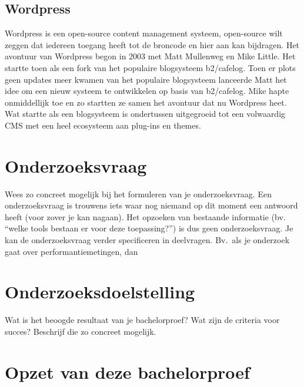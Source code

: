 \subsection{Wordpress}
Wordpress is een open-source content management systeem, open-source wilt zeggen dat iedereen toegang heeft tot de broncode en hier aan kan bijdragen. Het avontuur van Wordpress begon in 2003 met Matt Mullenweg en Mike Little. Het startte toen als een fork van het populaire blogsysteem b2/cafelog. Toen er plots geen updates meer kwamen van het populaire blogsysteem lanceerde Matt het idee om een nieuw systeem te ontwikkelen op basis van b2/cafelog. Mike hapte onmiddellijk toe en zo startten ze samen het avontuur dat nu Wordpress heet. Wat startte als een blogsysteem is ondertussen uitgegroeid tot een volwaardig CMS met een heel ecosysteem aan plug-ins en themes.



\section{Onderzoeksvraag}
\label{sec:onderzoeksvraag}

Wees zo concreet mogelijk bij het formuleren van je onderzoeksvraag. Een onderzoeksvraag is trouwens iets waar nog niemand op dit moment een antwoord heeft (voor zover je kan nagaan). Het opzoeken van bestaande informatie (bv. ``welke tools bestaan er voor deze toepassing?'') is dus geen onderzoeksvraag. Je kan de onderzoeksvraag verder specificeren in deelvragen. Bv.~als je onderzoek gaat over performantiemetingen, dan 

\section{Onderzoeksdoelstelling}
\label{sec:onderzoeksdoelstelling}

Wat is het beoogde resultaat van je bachelorproef? Wat zijn de criteria voor succes? Beschrijf die zo concreet mogelijk.

\section{Opzet van deze bachelorproef}
\label{sec:opzet-bachelorproef}


